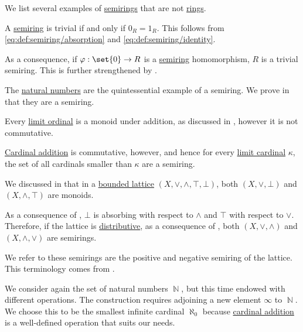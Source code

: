 \begin{example}\label{ex:def:semiring}
  We list several examples of \hyperref[def:semiring]{semirings} that are not \hyperref[def:ring]{rings}.

  \begin{thmenum}
     A \hyperref[def:semiring/homomorphism]{semiring} is trivial if and only if \( 0_R = 1_R \). This follows from \eqref{eq:def:semiring/absorption} and \eqref{eq:def:semiring/identity}.

    As a consequence, if \( \varphi: \set{ 0 } \to R \) is a \hyperref[def:semiring/homomorphism]{semiring} homomorphism, \( R \) is a trivial semiring. This is further strengthened by .

     The \hyperref[def:set_of_natural_numbers]{natural numbers} are the quintessential example of a semiring. We prove in  that they are a semiring.

     Every \hyperref[def:successor_and_limit_ordinal]{limit ordinal} is a monoid under addition, as discussed in , however it is not commutative.

    \hyperref[def:cardinal_arithmetic/addition]{Cardinal addition} is commutative, however, and hence for every \hyperref[def:successor_and_limit_cardinal/weak_limit]{limit cardinal} \( \kappa \), the set of all cardinals smaller than \( \kappa \) are a semiring.

     We discussed in  that in a \hyperref[def:semilattice/bounded]{bounded lattice} \( (X, \vee, \wedge, \top, \bot) \), both \( (X, \vee, \bot) \) and \( (X, \wedge, \top) \) are monoids.

    As a consequence of , \( \bot \) is absorbing with respect to \( \wedge \) and \( \top \) with respect to \( \vee \). Therefore, if the lattice is \hyperref[def:semilattice/distributive_lattice]{distributive}, as a consequence of , both \( (X, \vee, \wedge) \) and \( (X, \wedge, \vee) \) are semirings.

    We refer to these semirings are the positive and negative semiring of the lattice. This terminology comes from .

     We consider again the set of natural numbers \( \BbbN \), but this time endowed with different operations. The construction requires adjoining a new element \( \infty \) to \( \BbbN \). We choose this to be the smallest infinite cardinal \hyperref[def:aleph_hierarchy]{\( \aleph_0 \)} because \hyperref[def:cardinal_arithmetic/addition]{cardinal addition} is a well-defined operation that suits our needs.


\end{thmenum}
\end{example}
